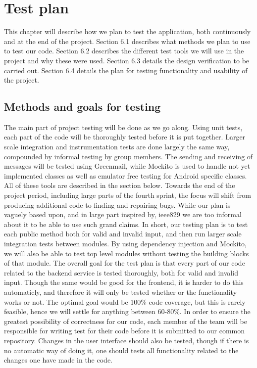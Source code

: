 \chapter{Test plan}

This chapter will describe how we plan to test the application, both continuously and at the end of the project. Section 6.1 describes what methods we plan to use to test our code. Section 6.2 describes the different test tools we will use in the project and why these were used. Section 6.3 details the design verification to be carried out. Section 6.4 details the plan for testing functionality and usability of the project. 

\section{Methods and goals for testing}

The main part of project testing will be done as we go along. Using unit tests, each part of the code will be thoroughly tested before it is put together. Larger scale integration and instrumentation tests are done largely the same way, compounded by informal testing by group members. The sending and receiving of messages will be tested using Greenmail, while Mockito is used to handle not yet implemented classes as well as emulator free testing for Android specific classes. All of these tools are described in the section below. Towards the end of the project period, including large parts of the fourth sprint, the focus will shift from producing additional code to finding and repairing bugs. While our plan is vaguely based upon, and in large part inspired by, \gls{ieee829} \cite{bib:ieee} we are too informal about it to be able to use such grand claims. In short, our testing plan is to test each public method both for valid and invalid input, and then run larger scale integration tests between modules.
By using dependency injection and Mockito, we will also be able to test top level modules without testing the building blocks of that module. 
\newline
\newline
The overall goal for the test plan is that every part of our code related to the backend service is tested thoroughly, both for valid and invalid input. Though the same would be good for the frontend,
it is harder to do this automaticly, and therefore it will only be tested whether or the functionality works or not. The optimal goal would be 100\% code coverage, but this is rarely feasible, hence
we will settle for anything between 60-80\%. 
\newline
\newline
In order to ensure the greatest possibility of correctness for our code, each member of the team will be responsible for writing test for their code before it is submitted to our common repository.
Changes in the user interface should also be tested, though if there is no automatic way of doing it, one should tests all functionality related to the changes one have made in the code. 



